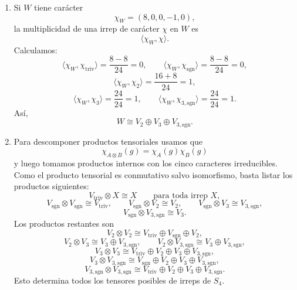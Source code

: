 \documentclass[10pt,a4paper]{article}
\begin{document}
\begin{enumerate}[label=(\alph*),leftmargin=2.4em]
También se puede ver por la suma de cuadrados de dimensiones:
\[
  1^2+1^2+2^2+3^2+3^2=24=|S_4|.
\]

\item Si $W$ tiene carácter
\[
  \chi_W=(8,0,0,-1,0),
\]
la multiplicidad de una irrep de carácter $\chi$ en $W$ es
\[
  \langle \chi_W,\chi\rangle.
\]
Calculamos:
\[
  \langle \chi_W,\chi_{\mathrm{triv}}\rangle
  =\frac{8-8}{24}=0,
  \qquad
  \langle \chi_W,\chi_{\mathrm{sgn}}\rangle
  =\frac{8-8}{24}=0,
\]
\[
  \langle \chi_W,\chi_2\rangle
  =\frac{16+8}{24}=1,
\]
\[
  \langle \chi_W,\chi_3\rangle
  =\frac{24}{24}=1,
  \qquad
  \langle \chi_W,\chi_{3,\mathrm{sgn}}\rangle
  =\frac{24}{24}=1.
\]
Así,
\[
  W\cong V_2\oplus V_3\oplus V_{3,\mathrm{sgn}}.
\]

\item Para descomponer productos tensoriales usamos que
\[
  \chi_{A\otimes B}(g)=\chi_A(g)\chi_B(g)
\]
y luego tomamos productos internos con los cinco caracteres irreducibles. Como el producto
tensorial es conmutativo salvo isomorfismo, basta listar los productos siguientes:
\[
  V_{\mathrm{triv}}\otimes X\cong X
  \qquad\text{para toda irrep }X,
\]
\[
  V_{\mathrm{sgn}}\otimes V_{\mathrm{sgn}}\cong V_{\mathrm{triv}},
  \qquad
  V_{\mathrm{sgn}}\otimes V_2\cong V_2,
  \qquad
  V_{\mathrm{sgn}}\otimes V_3\cong V_{3,\mathrm{sgn}},
\]
\[
  V_{\mathrm{sgn}}\otimes V_{3,\mathrm{sgn}}\cong V_3.
\]
Los productos restantes son
\[
  V_2\otimes V_2
  \cong V_{\mathrm{triv}}\oplus V_{\mathrm{sgn}}\oplus V_2,
\]
\[
  V_2\otimes V_3
  \cong V_3\oplus V_{3,\mathrm{sgn}},
  \qquad
  V_2\otimes V_{3,\mathrm{sgn}}
  \cong V_3\oplus V_{3,\mathrm{sgn}},
\]
\[
  V_3\otimes V_3
  \cong V_{\mathrm{triv}}\oplus V_2\oplus V_3\oplus V_{3,\mathrm{sgn}},
\]
\[
  V_3\otimes V_{3,\mathrm{sgn}}
  \cong V_{\mathrm{sgn}}\oplus V_2\oplus V_3\oplus V_{3,\mathrm{sgn}},
\]
\[
  V_{3,\mathrm{sgn}}\otimes V_{3,\mathrm{sgn}}
  \cong V_{\mathrm{triv}}\oplus V_2\oplus V_3\oplus V_{3,\mathrm{sgn}}.
\]
Esto determina todos los tensores posibles de irreps de $S_4$.
\end{enumerate}
\end{document}
